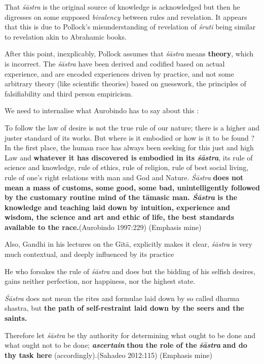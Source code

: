 That {\sl śāstra} is the original source of knowledge is acknowledged but then he digresses on some supposed {\sl bivalency} between rules and revelation. It appears that this is due to Pollock's misunderstanding of revelation of {\sl śruti} being similar to revelation akin to Abrahamic books.

After this point, inexplicably, Pollock assumes that {\sl śāstra} means {\bf theory}, which is incorrect. The {\sl śāstra} have been derived and codified based on actual experience, and are encoded experiences driven by practice, and not some arbitrary theory (like scientific theories) based on guesswork, the principles of falsifiability and third person empiricism.

We need to internalise what Aurobindo has to say about this :
\begin{myquote}
To follow the law of desire is not the true rule of our nature; there is a higher and juster standard of its works. But where is it embodied or how is it to be found ? In the first place, the human race has always been seeking for this just and high Law and {\bf whatever it has discovered is embodied in its {{\sl\bfseries śāstra}\relax}}, its rule of science and knowledge, rule of ethics, rule of religion, rule of best social living, rule of one's right relations with man and God and Nature. {\sl Śāstra} {\bf does not mean a mass of customs, some good, some bad, unintelligently followed by the customary routine mind of the tāmasic man. {{\sl\bfseries Śāstra}\relax} is the knowledge and teaching laid down by intuition, experience and wisdom, the science and art and ethic of life, the best standards available to the race.}\hfill (Aurobindo 1997:229) (Emphasis mine)
\end{myquote}

Also, Gandhi in his lectures on the Gītā, explicitly makes it clear, {\sl śāstra} is very much contextual, and deeply influenced by its practice
\begin{myquote}
He who forsakes the rule of {\sl śāstra} and does but the bidding of his selfish desires, gains neither perfection, nor happiness, nor the highest state.

\newpage

{\sl Śāstra} does not mean the rites and formulae laid down by so called dharma shastra, but {\bf the path of self-restraint laid down by the seers and the saints.}

Therefore let {\sl śāstra} be thy authority for determining what ought to be done and what ought not to be done; {{\sl\bfseries ascertain}\relax} {\bf thou the role of the} {{\sl\bfseries śāstra}\relax} {\bf and do thy task here} (accordingly).\hfill (Sahadeo 2012:115) (Emphasis mine)
\end{myquote}

